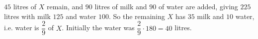 $45$ litres of $X$ remain, and $90$ litres of milk and $90$ of water are added, giving $225$ litres with milk $125$ and water $100$. So the remaining $X$ has $35$ milk and $10$ water, i.e. water is $\dfrac29$ of $X$. Initially the water was $\dfrac29\cdot180=\boxed{40}$ litres.
